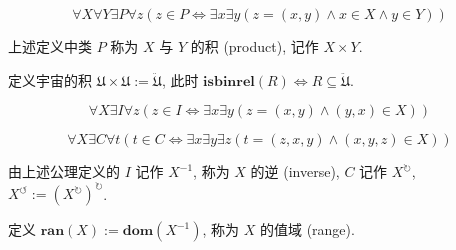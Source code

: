 \begin{axiom}
    \label {axiom:NBG Axiom of Product}
    \[
        \forall X \forall Y \exists P \forall z (z \in P \iff \exists x \exists y (z = (x,y) \land x \in X \land y \in Y))
    \]
\end{axiom}

\begin{definition}
    \label {definition:product of two classes}
    上述定义中类 \(P\) 称为 \(X\) 与 \(Y\) 的积 (product), 记作 \(X \times Y\).
\end{definition}

\begin{definition}
    定义宇宙的积 \(\mathfrak{U} \times \mathfrak{U} := \ddot {\mathfrak{U}}\),
    此时 \(\mathbf{isbinrel} (R) \iff R \subseteq \ddot {\mathfrak{U}}\).
\end{definition}

\begin{axiom}
    \label {axiom:NBG Axiom of Inversion}
    \[
        \forall X \exists I \forall z (z \in I \iff \exists x \exists y (z = (x,y) \land (y,x) \in X))
    \]
\end{axiom}

\begin{axiom}
    \label {axiom:NBG Axiom of Cycle}
    \[
        \forall X \exists C \forall t (t \in C \iff \exists x \exists y \exists z (t = (z,x,y) \land (x,y,z) \in X))
    \]
\end{axiom}

\begin{definition}
    由上述公理定义的 \(I\) 记作 \(X^{-1}\), 称为 \(X\) 的逆 (inverse), \(C\) 记作 \(X^{\circlearrowright}\), \(X^{\circlearrowleft} := {(X^{\circlearrowright})}^{\circlearrowright}\).
\end{definition}

\begin{definition}
    \label {definition:range}
    定义 \(\mathbf{ran} (X) := \mathbf{dom} (X^{-1})\), 称为 \(X\) 的值域 (range).
\end{definition}

